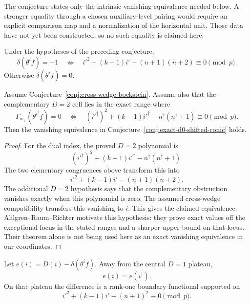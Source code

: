 The conjecture states only the intrinsic vanishing equivalence needed
below.  A stronger equality through a chosen auxiliary-level pairing would
require an explicit comparison map and a normalization of the horizontal
unit.  Those data have not yet been constructed, so no such equality is
claimed here.

\begin{conjecture}[Exact $D=0$ shifted-conic law]
\label{conj:exact-d0-shifted-conic}
Under the hypotheses of the preceding conjecture,
\[
 \delta(\theta^i f)=-1
 \quad\Longleftrightarrow\quad
 i'^2+(k-1)i'-(n+1)(n+2)\equiv0\pmod p.
\]
Otherwise $\delta(\theta^i f)=0$.
\end{conjecture}

\begin{proposition}
\label{prop:conditional-shifted-conic}
Assume Conjecture~\ref{conj:cross-wedge-bockstein}.  Assume also that the
complementary $D=2$ cell lies in the exact range where
\[
 \Gamma_{w_+}(\theta^{i^\dagger}f)=0
 \quad\Longleftrightarrow\quad
 (i'^\dagger)^2+(k-1)i'^\dagger
   -n^\dagger(n^\dagger+1)\equiv0\pmod p.
\]
Then the vanishing equivalence in
Conjecture~\ref{conj:exact-d0-shifted-conic} holds.
\end{proposition}

\begin{proof}
For the dual index, the proved $D=2$ polynomial is
\[
 (i'^\dagger)^2+(k-1)i'^\dagger
   -n^\dagger(n^\dagger+1).
\]
The two elementary congruences above transform this into
\[
 i'^2+(k-1)i'-(n+1)(n+2).
\]
The additional $D=2$ hypothesis says that the complementary obstruction
vanishes exactly when this polynomial is zero.  The assumed cross-wedge
compatibility transfers this vanishing to $i$.  This gives the claimed
equivalence.  Ahlgren--Raum--Richter \cite[Theorem~C]{ARR2026} motivate
this hypothesis: they prove exact values off the exceptional locus in the
stated ranges and a sharper upper bound on that locus.  Their theorem alone
is not being used here as an exact vanishing equivalence in our coordinates.
\end{proof}

\begin{conjecture}
\label{conj:corrected-global-duality}
Let $e(i)=D(i)-\delta(\theta^i f)$. Away from the central $D=1$ plateau,
\[
 e(i)=e(i^\dagger).
\]
On that plateau the difference is a rank-one boundary functional supported
on
\[
 i'^2+(k-1)i'-(n+1)^2\equiv0\pmod p.
\]
\end{conjecture}
